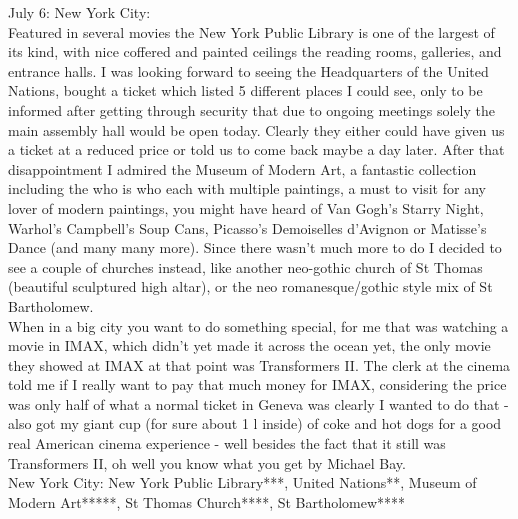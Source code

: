 July 6: New York City:\\
Featured in several movies the New York Public Library is one of the largest of its kind, with nice coffered and painted ceilings the reading rooms, galleries, and entrance halls. I was looking forward to seeing the Headquarters of the United Nations, bought a ticket which listed 5 different places I could see, only to be informed after getting through security that due to ongoing meetings solely the main assembly hall would be open today. Clearly they either could have given us a ticket at a reduced price or told us to come back maybe a day later. After that disappointment I admired the Museum of Modern Art, a fantastic collection including the who is who each with multiple paintings, a must to visit for any lover of modern paintings, you might have heard of Van Gogh's Starry Night, Warhol's Campbell's Soup Cans, Picasso's Demoiselles d'Avignon or Matisse's Dance (and many many more). Since there wasn't much more to do I decided to see a couple of churches instead, like another neo-gothic church of St Thomas (beautiful sculptured high altar), or the neo romanesque/gothic style mix of St Bartholomew.\\
When in a big city you want to do something special, for me that was watching a movie in IMAX, which didn't yet made it across the ocean yet, the only movie they showed at IMAX at that point was Transformers II. The clerk at the cinema told me if I really want to pay that much money for IMAX, considering the price was only half of what a normal ticket in Geneva was clearly I wanted to do that - also got my giant cup (for sure about 1 l inside) of coke and hot dogs for a good real American cinema experience - well besides the fact that it still was Transformers II, oh well you know what you get by Michael Bay.\\

New York City: New York Public Library***, United Nations**, Museum of Modern Art*****, St Thomas Church****, St Bartholomew****\\

